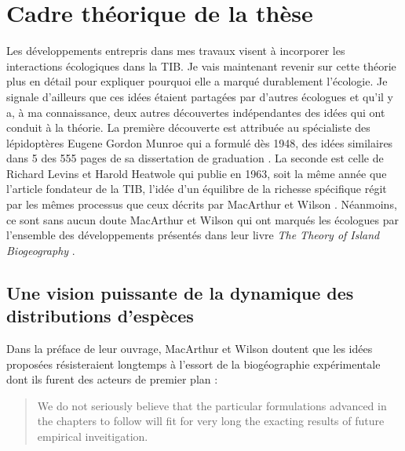 \section*{Cadre théorique de la
thèse}\label{cadre-thuxe9orique-de-la-thuxe8se}

Les développements entrepris dans mes travaux visent à incorporer les
interactions écologiques dans la TIB. Je vais maintenant revenir sur
cette théorie plus en détail pour expliquer pourquoi elle a marqué
durablement l'écologie. Je signale d'ailleurs que ces idées étaient
partagées par d'autres écologues et qu'il y a, à ma connaissance, deux
autres découvertes indépendantes des idées qui ont conduit à la théorie.
La première découverte est attribuée au spécialiste des lépidoptères
Eugene Gordon Munroe qui a formulé dès 1948, des idées similaires dans 5
des 555 pages de sa dissertation de graduation
\citep{Brown1989, Lomolino2009}. La seconde est celle de Richard Levins
et Harold Heatwole qui publie en 1963, soit la même année que l'article
fondateur de la TIB, l'idée d'un équilibre de la richesse spécifique
régit par les mêmes processus que ceux décrits par MacArthur et Wilson
\citep{Levins1963}. Néanmoins, ce sont sans aucun doute MacArthur et
Wilson qui ont marqués les écologues par l'ensemble des développements
présentés dans leur livre \emph{The Theory of Island Biogeography}
\citep{MacArthur1967a}.

\subsection*{Une vision puissante de la dynamique des distributions
d'espèces}\label{une-vision-puissante-de-la-dynamique-des-distributions-despuxe8ces}

Dans la préface de leur ouvrage, MacArthur et Wilson doutent que les
idées proposées résisteraient longtemps à l'essort de la biogéographie
expérimentale dont ils furent des acteurs de premier plan :

\begin{quote}
We do not seriously believe that the particular formulations advanced in
the chapters to follow will fit for very long the exacting results of
future empirical inveitigation.
\end{quote}

